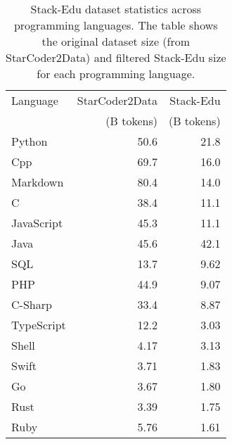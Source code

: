 \begin{table}[h]
\caption{Stack-Edu dataset statistics across programming languages. The table shows the original dataset size (from StarCoder2Data) and filtered Stack-Edu size for each programming language.}
\label{tab:stack-edu-all-stats}
\centering
\small
\begin{tabular}{@{}lrr@{}}
\toprule
Language & StarCoder2Data & Stack-Edu \\
& (B tokens) & (B tokens) \\
\midrule
Python & 50.6 & 21.8 \\
Cpp & 69.7 & 16.0 \\
Markdown & 80.4 & 14.0 \\
C & 38.4 & 11.1 \\
JavaScript & 45.3 & 11.1 \\
Java & 45.6 & 42.1  \\
SQL & 13.7 & 9.62 \\
PHP & 44.9 & 9.07 \\
C-Sharp & 33.4 & 8.87 \\
TypeScript & 12.2 & 3.03 \\
Shell & 4.17 & 3.13 \\
Swift & 3.71 & 1.83 \\
Go & 3.67 & 1.80 \\
Rust & 3.39 & 1.75 \\
Ruby & 5.76 & 1.61 \\
\bottomrule
\end{tabular}
\end{table}